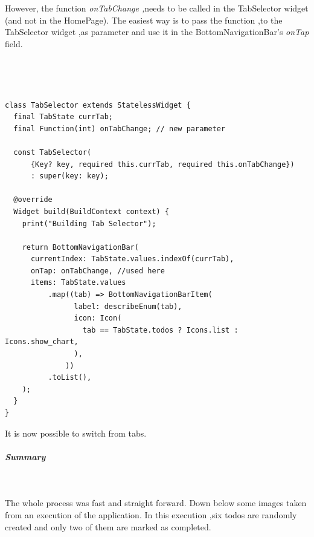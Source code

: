  However, the function  \textit{onTabChange ,}needs to be called in the TabSelector widget (and not in the HomePage). The easiest way is to pass the function ,to the TabSelector widget ,as parameter and use it in the BottomNavigationBar's \textit{onTap }field.


\mbox{}\\
\begin{code}
\mbox{}\\

\begin{verbatim}
class TabSelector extends StatelessWidget {
  final TabState currTab;
  final Function(int) onTabChange; // new parameter

  const TabSelector(
      {Key? key, required this.currTab, required this.onTabChange})
      : super(key: key);

  @override
  Widget build(BuildContext context) {
    print("Building Tab Selector");

    return BottomNavigationBar(
      currentIndex: TabState.values.indexOf(currTab),
      onTap: onTabChange, //used here
      items: TabState.values
          .map((tab) => BottomNavigationBarItem(
                label: describeEnum(tab),
                icon: Icon(
                  tab == TabState.todos ? Icons.list : Icons.show_chart,
                ),
              ))
          .toList(),
    );
  }
}

\end{verbatim}
\end{code}

It is now possible to switch from tabs.


\subparagraph{Summary}\mbox{}\\
\label{subpar:todo_app_inherited_widget_summary}

The whole process was fast and straight forward. Down below some images taken from an execution of the application. In this execution ,six todos are randomly created and only two of them are marked as completed. 

